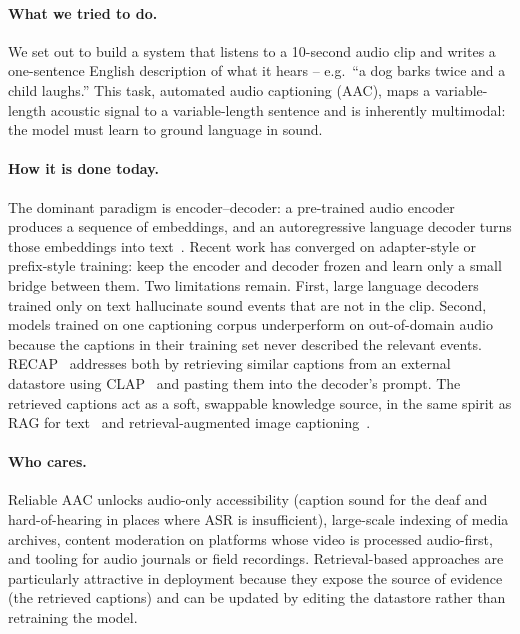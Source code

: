 \documentclass[10pt,twocolumn,letterpaper]{article}
\begin{document}
\paragraph{What we tried to do.}
We set out to build a system that listens to a 10-second audio clip and writes
a one-sentence English description of what it hears -- e.g.\ ``a dog barks
twice and a child laughs.'' This task, automated audio captioning (AAC),
maps a variable-length acoustic signal to a variable-length sentence and is
inherently multimodal: the model must learn to ground language in sound.

\paragraph{How it is done today.}
The dominant paradigm is encoder--decoder: a pre-trained audio encoder produces
a sequence of embeddings, and an autoregressive language decoder turns those
embeddings into text~\cite{gontier2021bart,kim2023prefix,mei2021act,chen2020audiocaptioning}.
Recent work has converged on adapter-style or prefix-style training: keep the
encoder and decoder frozen and learn only a small bridge between them.
Two limitations remain. First, large language decoders trained only on text
hallucinate sound events that are not in the clip. Second, models trained on
one captioning corpus underperform on out-of-domain audio because the captions
in their training set never described the relevant events.
RECAP~\cite{ghosh2024recap} addresses both by retrieving similar captions from
an external datastore using CLAP~\cite{wu2023clap} and pasting them into the
decoder's prompt. The retrieved captions act as a soft, swappable knowledge
source, in the same spirit as RAG for text~\cite{lewis2020rag} and
retrieval-augmented image captioning~\cite{sarto2022retrieval,ramos2023smallcap}.

\paragraph{Who cares.}
Reliable AAC unlocks audio-only accessibility (caption sound for the
deaf and hard-of-hearing in places where ASR is insufficient), large-scale
indexing of media archives, content moderation on platforms whose video is
processed audio-first, and tooling for audio journals or field recordings.
Retrieval-based approaches are particularly attractive in deployment because
they expose the source of evidence (the retrieved captions) and can be updated
by editing the datastore rather than retraining the model.
\end{document}
